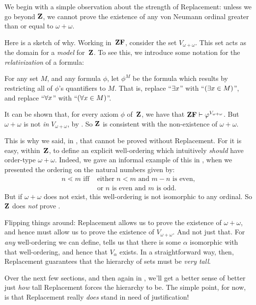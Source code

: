 \documentclass[../../../include/open-logic-section]{subfiles}
\begin{document}

We begin with a simple observation about the strength of Replacement: unless we go beyond $\mathbf{Z}$, we cannot prove the existence of any von Neumann
ordinal greater than or equal to $\omega + \omega$. 

Here is a sketch of
why. Working in~$\mathbf{ZF}$, consider the set $V_{\omega+\omega}$. This set acts
as the domain for a \emph{model} for~$\mathbf{Z}$. To see this, we introduce some notation for the \emph{relativization} of a formula: 
\begin{defn}
	For any set $M$, and any formula $\phi$, let $\phi^M$ be the formula which results by restricting all of $\phi$'s quantifiers to $M$. That is, replace ``$\lexists[x]$'' with ``$(\lexists[x \in M])$'', and
	replace ``$\lforall[x]$'' with ``$(\lforall[x \in M])$''. 
\end{defn}\noindent
It can be shown that, for every axiom $\phi$ of~$\mathbf{Z}$, we have that $\mathbf{ZF} \vdash
\varphi^{V_{\omega+\omega}}$. But $\omega+\omega$ is not \emph{in}
$V_{\omega+\omega}$, by  . So $\mathbf{Z}$ is
consistent with the non-existence of $\omega+\omega$.

This is why we said, in , that
 cannot be proved
without Replacement. For it is easy, within~$\mathbf{Z}$, to define an
explicit well-ordering which intuitively \emph{should} have order-type
$\omega+\omega$. Indeed, we gave an informal example of this in
, when we presented the ordering on the
natural numbers given by:
\begin{align*}
	n \lessdot m \text{ iff }&\text{either }n < m\text{ and }m-n\text{ is even,}\\
	& \text{or $n$ is even and $m$ is odd.}
\end{align*}
But if $\omega+\omega$ does not exist, this well-ordering is not
isomorphic to any ordinal. So $\mathbf{Z}$ does \emph{not} prove
. 

Flipping things around: Replacement allows us to prove the existence
of $\omega+\omega$, and hence must allow us to prove the existence of
$V_{\omega+\omega}$. And not just that. For \emph{any} well-ordering
we can define, 
tells us that there is some $\alpha$ isomorphic with that
well-ordering, and hence that $V_\alpha$ exists. In a straightforward
way, then, Replacement guarantees that the hierarchy of sets must be
\emph{very tall}. 

Over the next few sections, and then again in
, we'll get a better sense of better
just \emph{how} tall Replacement forces the hierarchy to be. The
simple point, for now, is that Replacement really \emph{does} stand in
need of justification!
\end{document}
